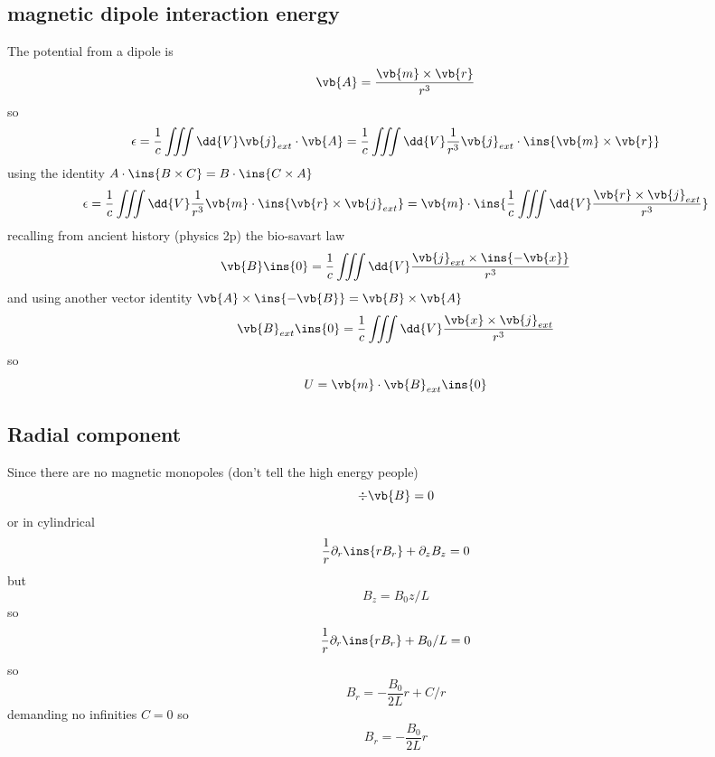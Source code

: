 \subsection{magnetic dipole interaction energy}
The potential from a dipole is 
\begin{equation}
	\vb{A}=\frac{\vb{m}\times\vb{r}}{r^3}
\end{equation}
so 
\begin{equation}
	\epsilon = \frac{1}{c}\iiint\dd{V}\vb{j}_{ext}\cdot\vb{A}=\frac{1}{c}\iiint\dd{V}\frac{1}{r^3}\vb{j}_{ext}\cdot\ins{\vb{m}\times\vb{r}}
\end{equation}
using the identity \(A\cdot\ins{B\times C}=B\cdot\ins{C\times A}\)
\begin{equation}
	\epsilon=\frac{1}{c}\iiint\dd{V}\frac{1}{r^3}\vb{m}\cdot\ins{\vb{r}\times\vb{j}_{ext}}=\vb{m}\cdot\ins{\frac{1}{c}\iiint\dd{V}\frac{\vb{r}\times\vb{j}_{ext}}{r^3}}
\end{equation}
recalling from ancient history (physics 2p) the bio-savart law 
\begin{equation}
	\vb{B}\ins{0}=\frac{1}{c}\iiint\dd{V}\frac{\vb{j}_{ext}\times\ins{-\vb{x}}}{r^3}
\end{equation}
and using another vector identity \(\vb{A}\times\ins{-\vb{B}}=\vb{B}\times\vb{A}\)
\begin{equation}
	\vb{B}_{ext}\ins{0}=\frac{1}{c}\iiint\dd{V}\frac{\vb{x}\times\vb{j}_{ext}}{r^3}
\end{equation}
so 
\begin{equation}
	U = \vb{m}\cdot\vb{B}_{ext}\ins{0}
\end{equation}
\subsection{Radial component}
Since there are no magnetic monopoles (don't tell the high energy people)
\begin{equation}
	\div{\vb{B}}=0
\end{equation}
or in cylindrical
\begin{equation}
	\frac{1}{r}\partial_r\ins{rB_r}+\partial_z B_z=0
\end{equation}
but 
\begin{equation}
	B_z = B_0 z / L
\end{equation}
so 
\begin{equation}
	\frac{1}{r}\partial_r\ins{rB_r}+B_0/L=0
\end{equation}
so 
\begin{equation}
	B_r = -\frac{B_0}{2L}r+C/r
\end{equation}
demanding no infinities \(C=0\) so
\begin{equation}
	B_r = -\frac{B_0}{2L}r
\end{equation}
